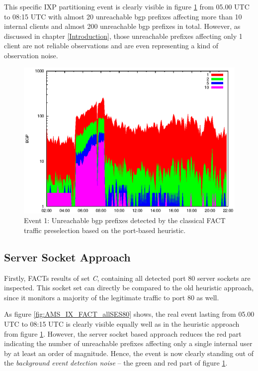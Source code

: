 This specific IXP partitioning event is clearly visible in figure 
\ref{fig:AMS_IX_FACT_REF} from 05.00 UTC to 08:15 UTC with almost 20 unreachable 
\gls{bgp} prefixes affecting more than 10 internal clients and almost 200 
unreachable \gls{bgp} prefixes in total. 
However, as discussed in chapter \ref{Introduction}, those unreachable prefixes 
affecting only 1 client are not reliable observations and are even representing 
a kind of observation noise. 
\begin{figure}
	[p] \centering 
	\includegraphics[width=0.75\linewidth]{images/events/2010_03_25/bgp_log_port80_ref.eps} \caption{Event 1: Unreachable \gls{bgp} prefixes detected by the classical \gls{FACT} traffic preselection based on the port-based heuristic.} 
	\label{fig:AMS_IX_FACT_REF} 
\end{figure}

\subsection{Server Socket Approach}

Firstly, \gls{FACT}s results of set \emph{C}, containing all detected port 80 
\glspl{server socket} are inspected. This socket set can directly be compared to 
the old heuristic approach, since it monitors a majority of the legitimate 
traffic to port 80 as well. 

As figure \ref{fig:AMS_IX_FACT_allSES80} shows, the real event lasting from 
05.00 UTC to 08:15 UTC is clearly visible equally well as in the heuristic 
approach from figure \ref{fig:AMS_IX_FACT_REF}. However, the \gls{server socket} 
based approach reduces the red part indicating the number of unreachable 
prefixes affecting only a single internal user by at least an order of 
magnitude. 
Hence, the event is now clearly standing out of the \emph{background event 
detection noise} -- the green and red part of figure \ref{fig:AMS_IX_FACT_REF}. 

